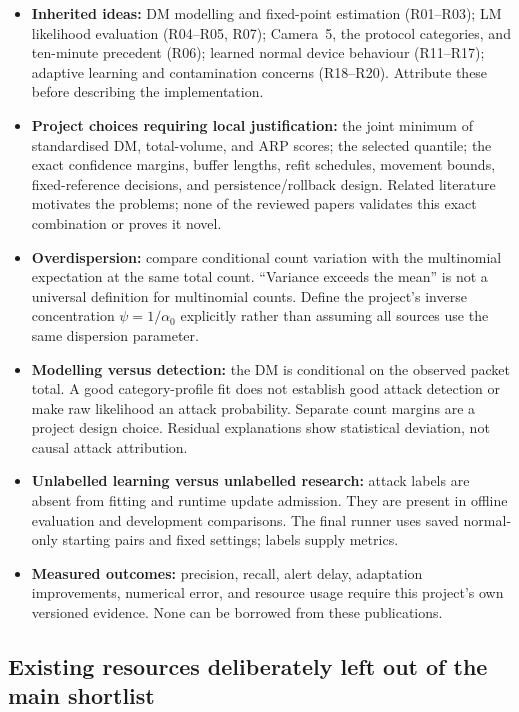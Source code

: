 \documentclass[11pt,a4paper]{article}
\begin{document}
\begin{itemize}
\item \textbf{Inherited ideas:} DM modelling and fixed-point estimation
  (R01--R03); LM likelihood evaluation (R04--R05, R07); Camera~5,
  the protocol categories, and ten-minute precedent (R06); learned normal
  device behaviour (R11--R17); adaptive learning and contamination concerns
  (R18--R20). Attribute these before describing the implementation.
\item \textbf{Project choices requiring local justification:} the joint minimum
  of standardised DM, total-volume, and ARP scores; the selected quantile;
  the exact confidence margins, buffer lengths, refit schedules, movement
  bounds, fixed-reference decisions, and persistence/rollback design.
  Related literature motivates the problems; none of the reviewed papers
  validates this exact combination or proves it novel.
\item \textbf{Overdispersion:} compare conditional count variation with the
  multinomial expectation at the same total count. ``Variance exceeds the
  mean'' is not a universal definition for multinomial counts.
  Define the project's inverse concentration $\psi=1/\alpha_0$ explicitly
  rather than assuming all sources use the same dispersion parameter.
\item \textbf{Modelling versus detection:} the DM is conditional on the
  observed packet total. A good category-profile fit does not establish good
  attack detection or make raw likelihood an attack probability. Separate
  count margins are a project design choice. Residual explanations show
  statistical deviation, not causal attack attribution.
\item \textbf{Unlabelled learning versus unlabelled research:} attack labels
  are absent from fitting and runtime update admission. They are present
  in offline evaluation and development comparisons. The final runner uses
  saved normal-only starting pairs and fixed settings; labels supply metrics.
\item \textbf{Measured outcomes:} precision, recall, alert delay, adaptation
  improvements, numerical error, and resource usage require this project's
  own versioned evidence. None can be borrowed from these publications.
\end{itemize}

\subsection{Existing resources deliberately left out of the main shortlist}
\end{document}
